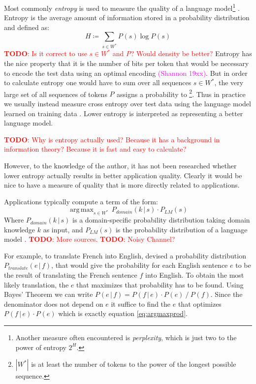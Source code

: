 \documentclass[11pt,a4paper]{article}
\newcommand\givenbase[1][]{\,#1\lvert\,}
\let\given\givenbase
\DeclareMathOperator*{\argmax}{arg\,max}
\newcommand{\cardinality}[1]{|#1|}
\newcommand{\probSymbol}[1][]{P_{#1}}
\newcommand{\prob}[2][]{\probSymbol[#1](#2)}
\newcommand{\probCond}[3][]{\prob[#1]{#2 \given #3}}
\newcommand{\todo}[1]{\textcolor{red}{\textbf{TODO}: #1}}
\newcommand{\mbref}[1]{\textcolor{magenta}{(#1)}}
\begin{document}
Most commonly \emph{entropy} is used to measure the quality of a language
model\footnote{Another measure often encountered is \emph{perplexity}, which is
just two to the power of entropy $2^H$.} \parencite{Goodman2001}.
Entropy is the average amount of information stored in a probability
distribution and defined as:
\begin{equation}
  H \coloneqq \sum_{s \in W^*} \prob{s} \log \prob{s}
\end{equation}
\todo{Is it correct to use $s \in W^*$ and $\probSymbol$? Would density be
better?}
Entropy has the nice property that it is the number of bits per token that would
be necessary to encode the test data using an optimal encoding
\mbref{Shannon 19xx}.
But in order to calculate entropy one would have to sum over all sequences
$s \in W^*$, the very large set of all sequences of tokens $\probSymbol$ assigns
a probability to \footnote{$\cardinality{W^*}$ is at least the number of tokens
to the power of the longest possible sequence.}.
Thus in practice we usually instead measure cross entropy over test data using
the language model learned on training data \parencite{Goodman2001}.
Lower entropy is interpreted as representing a better language model.

\todo{Why is entropy actually used? Because it has a background in information
theory? Because it is fast and easy to calculate?}

However, to the knowledge of the author, it has not been researched whether
lower entropy actually results in better application quality.
Clearly it would be nice to have a measure of quality that is more directly
related to applications.

Applications typically compute a term of the form:
\begin{equation}\label{eq:argmaxprod}
  \argmax_{s \in W^*} \, \probCond[domain]{k}{s} \cdot \prob[LM]{s}
\end{equation}
Where $\probCond[domain]{k}{s}$ is a domain-specific probability distribution
taking domain knowledge $k$ as input, and $\prob[LM]{s}$ is the
probability distribution of a language model \parencite{Church1988,Brown1990}.
\todo{More sources.} \todo{Noisy Channel?}

For example, to translate French into English, \cite{Brown1990} devised a
probability distribution $\probCond[translate]{e}{f}$, that would give the
probability for each English sentence $e$ to be the result of translating
the French sentence $f$ into English.
To obtain the most likely translation, the $e$ that maximizes that probability
has to be found.
Using Bayes' Theorem we can write
$\probCond{e}{f} = {\probCond{f}{e}\cdot\prob{e} \mathbin{/} \prob{f}}$.
Since the denominator does not depend on $e$ it suffice to find the $e$ that
optimizes ${\probCond{f}{e} \cdot \prob{e}}$ which is exactly equation
\eqref{eq:argmaxprod}.
\end{document}
